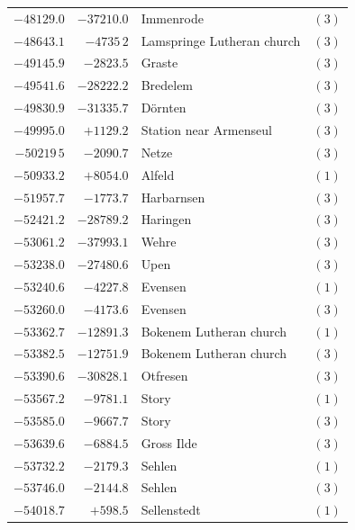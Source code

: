 \begin{center}
\begin{tabular}{r|r|p{170pt}|r}
\(-48129.0\)&\(-37210.0\)&Immenrode&\((3)\)\\
\(-48643.1\)&\(-4735\,2\)&Lamspringe Lutheran church&\((3)\)\\
\(-49145.9\)&\(-2823.5\)&Graste&\((3)\)\\
\(-49541.6\)&\(-28222.2\)&Bredelem&\((3)\)\\
\(-49830.9\)&\(-31335.7\)&Dörnten&\((3)\)\\
\(-49995.0\)&\(+1129.2\)&Station near Armenseul&\((3)\)\\
\(-50219\,5\)&\(-2090.7\)&Netze&\((3)\)\\
\(-50933.2\)&\(+8054.0\)&Alfeld&\((1)\)\\
\(-51957.7\)&\(-1773.7\)&Harbarnsen&\((3)\)\\
\(-52421.2\)&\(-28789.2\)&Haringen&\((3)\)\\
\(-53061.2\)&\(-37993.1\)&Wehre&\((3)\)\\
\(-53238.0\)&\(-27480.6\)&Upen&\((3)\)\\
\(-53240.6\)&\(-4227.8\)&Evensen&\((1)\)\\
\(-53260.0\)&\(-4173.6\)&Evensen&\((3)\)\\
\(-53362.7\)&\(-12891.3\)&Bokenem Lutheran church&\((1)\)\\
\(-53382.5\)&\(-12751.9\)&Bokenem Lutheran church&\((3)\)\\
\(-53390.6\)&\(-30828.1\)&Otfresen&\((3)\)\\
\(-53567.2\)&\(-9781.1\)&Story&\((1)\)\\
\(-53585.0\)&\(-9667.7\)&Story&\((3)\)\\
\(-53639.6\)&\(-6884.5\)&Gross Ilde&\((3)\)\\
\(-53732.2\)&\(-2179.3\)&Sehlen&\((1)\)\\
\(-53746.0\)&\(-2144.8\)&Sehlen&\((3)\)\\
\(-54018.7\)&\(+598.5\)&Sellenstedt&\((1)\)\\
\hline\end{tabular}\endgroup\end{center}
\clearpage
